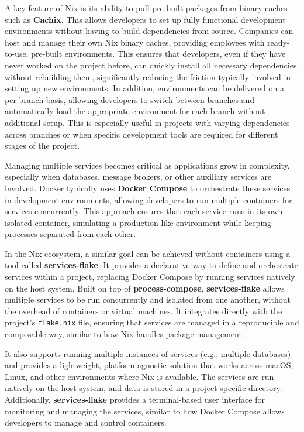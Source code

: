 A key feature of Nix is its ability to pull pre-built packages from binary caches such as
\textbf{Cachix}. This allows developers to set up fully functional development environments
without having to build dependencies from source. Companies can host and manage their own
Nix binary caches, providing employees with ready-to-use, pre-built environments. This
ensures that developers, even if they have never worked on the project before, can quickly
install all necessary dependencies without rebuilding them, significantly reducing the
friction typically involved in setting up new environments. In addition, environments can
be delivered on a per-branch basis, allowing developers to switch between branches and
automatically load the appropriate environment for each branch without additional setup.
This is especially useful in projects with varying dependencies across branches or when
specific development tools are required for different stages of the project.

Managing multiple services becomes critical as applications grow in complexity, especially
when databases, message brokers, or other auxiliary services are involved. Docker typically
uses \textbf{Docker Compose} to orchestrate these services in development environments,
allowing developers to run multiple containers for services concurrently. This approach
ensures that each service runs in its own isolated container, simulating a production-like
environment while keeping processes separated from each other.

In the Nix ecosystem, a similar goal can be achieved without containers using a tool called
\textbf{services-flake}. It provides a declarative way to define and
orchestrate services within a project, replacing Docker Compose by running services natively
on the host system. Built on top of \textbf{process-compose}, \textbf{services-flake} allows
multiple services to be run concurrently and isolated from one another, without the overhead
of containers or virtual machines. It integrates directly with the project’s \texttt{flake.nix}
file, ensuring that services are managed in a reproducible and composable way, similar to
how Nix handles package management.

It also supports running multiple instances of services (e.g., multiple
databases) and provides a lightweight, platform-agnostic solution that works across macOS,
Linux, and other environments where Nix is available. The services are run natively on
the host system, and data is stored in a project-specific directory. Additionally,
\textbf{services-flake} provides a terminal-based user interface for monitoring and managing
the services, similar to how Docker Compose allows developers to manage and control containers.

